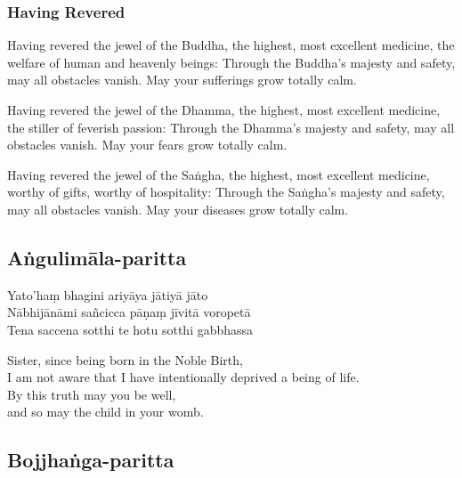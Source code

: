 \subsubsection{Having Revered}



Having revered the jewel of the Buddha, the highest, most excellent medicine,
the welfare of human and heavenly beings: Through the Buddha's majesty and
safety, may all obstacles vanish. May your sufferings grow totally calm.

Having revered the jewel of the Dhamma, the highest, most excellent medicine,
the stiller of feverish passion: Through the Dhamma's majesty and safety, may
all obstacles vanish. May your fears grow totally calm.

Having revered the jewel of the Saṅgha, the highest, most excellent medicine,
worthy of gifts, worthy of hospitality: Through the Saṅgha's majesty and safety,
may all obstacles vanish. May your diseases grow totally calm.

\subsection{Aṅgulimāla-paritta}
\label{yato-ham-bhagini}


\begin{paritta}
Yato'haṃ bhagini ariyāya jātiyā jāto\\
Nābhijānāmi sañcicca pāṇaṃ jīvitā voropetā\\
Tena saccena sotthi te hotu sotthi gabbhassa 
\end{paritta}



\begin{english}
  Sister, since being born in the Noble Birth,\\
  I am not aware that I have intentionally deprived a being of life.\\
  By this truth may you be well,\\
  and so may the child in your womb.
\end{english}

\subsection{Bojjhaṅga-paritta}
\label{bojjhango}

